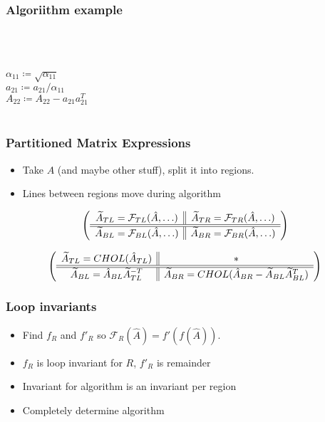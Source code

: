 \documentclass{beamer}
\newcommand*{\opF}{\mathcal{F}}
\newcommand*{\opf}{f}
\begin{document}
\begin{frame}
  \frametitle{Algoriithm example}
  \begin{FlameAlg}
    \\
    \\
    \\
    $\alpha_{11} \coloneqq \sqrt{\alpha_{11}}$\\
    $a_{21} \coloneqq a_{21} / \alpha_{11}$\\
    $A_{22} \coloneqq A_{22} - a_{21}a_{21}^T$\\
    \\
    \FlaEndDo{}
  \end{FlameAlg}
\end{frame}

\begin{frame}
  \frametitle{Partitioned Matrix Expressions}
  \begin{itemize}
  \item Take $A$ (and maybe other stuff), split it into regions.
  \item Lines between regions move during algorithm
  \end{itemize}
  \begin{equation*}
    \FlaTwoByTwo{\widetilde{A}_{TL} = \opF_{TL}(\hat{A}, \ldots)}{\widetilde{A}_{TR} = \opF_{TR}(\hat{A}, \ldots)}
    {\widetilde{A}_{BL} = \opF_{BL}(\hat{A}, \ldots)}{\widetilde{A}_{BR} = \opF_{BR}(\hat{A}, \ldots)}
  \end{equation*}

  \begin{equation*}
    \left( \begin{array}{c || c} \widetilde{A}_{TL} = CHOL(\hat{A}_{TL}) & * \\ \hline \hline \widetilde{A}_{BL} = \hat{A}_{BL}\widetilde{A}_{TL}^{-T} & \widetilde{A}_{BR} = CHOL(\hat{A}_{BR} - \widetilde{A}_{BL}\widetilde{A}_{BL}^T) \end{array} \right)
  \end{equation*}
\end{frame}

\begin{frame}
  \frametitle{Loop invariants}
  \begin{itemize}
  \item Find $\opf_R$ and $\opf'_R$ so $\opF_R(\hat{A}) = \opf'(\opf(\hat{A}))$.
  \item $\opf_R$ is loop invariant for $R$, $\opf'_R$ is remainder
  \item Invariant for algorithm is an invariant per region
  \item Completely determine algorithm
  \end{itemize}
\end{frame}
\end{document}
